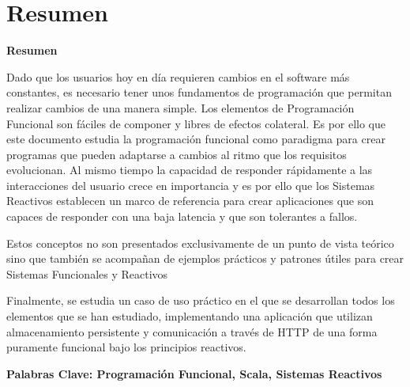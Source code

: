 \documentclass[../main.tex]{subfiles}
\begin{document}
\makeatletter
\renewenvironment{abstract}{%
    \if@twocolumn
      \section*{Resumen \\}%
    \else %
    \begin{flushright}
        {\filleft\Huge\bfseries\fontsize{48pt}{12}\selectfont Resumen\vspace{\z@}}%
        \end{flushright}
      \quotation
    \fi}
    {\if@twocolumn\else\endquotation\fi}
\makeatother
\begin{abstract}
Dado que los usuarios hoy en día requieren cambios en el software más constantes, es necesario tener unos fundamentos de programación que permitan realizar cambios de una manera simple. Los elementos de Programación Funcional son fáciles de componer y libres de efectos colateral. Es por ello que este documento estudia la programación funcional como paradigma para crear programas que pueden adaptarse a cambios al ritmo que los requisitos evolucionan. Al mismo tiempo la capacidad de responder rápidamente a las interacciones del usuario crece en importancia y es por ello que los Sistemas Reactivos establecen un marco de referencia para crear aplicaciones que son capaces de responder con una baja latencia y que son tolerantes a fallos.

Estos conceptos no son presentados exclusivamente de un punto de vista teórico sino que también se acompañan de ejemplos prácticos y patrones útiles para crear Sistemas Funcionales y Reactivos

Finalmente, se estudia un caso de uso práctico en el que se desarrollan todos los elementos que se han estudiado, implementando una aplicación que utilizan almacenamiento persistente y comunicación a través de HTTP de una forma puramente funcional bajo los principios reactivos.

\bfseries{\large{Palabras Clave:}} Programación Funcional, Scala, Sistemas Reactivos

\end{abstract}
\end{document}
